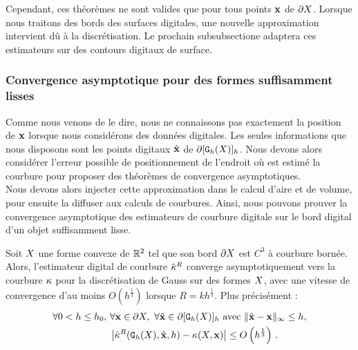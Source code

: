%
Cependant, ces théorèmes ne sont valides que pour tous points $\mathbf{x}$ de $\partial X$.
Lorsque nous traitons des bords des surfaces digitales, une nouvelle
approximation intervient dû à la discrétisation. Le prochain subsubsectione adaptera
ces estimateurs sur des contours digitaux de surface.
%
\subsubsection{Convergence asymptotique pour des formes suffisamment lisses}
%
Comme nous venons de le dire, nous ne connaissons pas exactement la position de
$\mathbf{x}$ lorsque nous considérons des données digitales. Les seules informations
que nous disposons sont les points digitaux $\hat{\mathbf{x}}$ de $\partial \lbrack \mathtt{G}_{h}(X) \rbrack_{h}$.
Nous devons alors considérer l'erreur possible de positionnement de l'endroit où
est estimé la courbure pour proposer des théorèmes de convergence
asymptotiques.\\
%
Nous devons alors injecter cette approximation dans le calcul d'aire et de
volume, pour ensuite la diffuser aux calculs de courbures. Ainsi, nous pouvons
prouver la convergence asymptotique des estimateurs de courbure digitale sur le
bord digital d'un objet suffisamment lisse.
%
\begin{theorem} \label{thm:multigrid-convergence-curv}
%
Soit $X$ une forme convexe de $\mathbb{R}^2$ tel que son bord $\partial X$ est $C^3$ à
courbure bornée. Alors, l'estimateur digital de courbure $\hat{\kappa}^{R}$ converge
asymptotiquement vers la courbure $\kappa$ pour la discrétisation de Gauss sur
des formes $X$, avec une vitesse de convergence d'au moins
$O(h^\frac{1}{3})$ lorsque $R = kh^\frac{1}{3}$. Plus précisément :
%
\begin{align}
  \forall 0 < h \le h_0,\,\, & \forall \mathbf{x} \in \partial X,\,\,
  \forall \hat{\mathbf{x}} \in \partial \lbrack \mathtt{G}_{h}(X) \rbrack_{h} \text{~avec~} \| \hat{\mathbf{x}} -\mathbf{x}\|_\infty \le h, \nonumber \\
  & \left| \hat{\kappa}^{R}(\mathtt{G}_{h}(X), \hat{\mathbf{x}}, h) - \kappa(X, \mathbf{x}) \right| \le O\left(h^{\frac{1}{3}}\right)\,.
\end{align}
%
\end{theorem}
%
